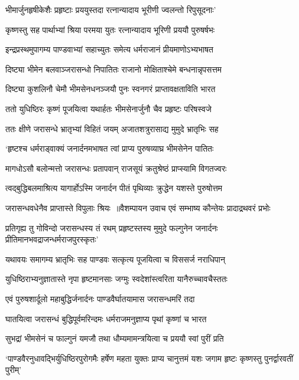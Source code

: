 \twolineshloka
{भीमार्जुनहृषीकेशैः प्रहृष्टाः प्रययुस्तदा}
{रत्नान्यादाय भूरीणी ज्वलन्तो रिपुसूदनाः'}


\twolineshloka
{कृष्णस्तु सह पार्थाभ्यां श्रिया परमया युतः}
{रत्नान्यादाय भूरिणी प्रययौ पुरुषर्षभः}


\twolineshloka
{इन्द्रप्रस्थमुपागम्य पाण्डवाभ्यां सहाच्युतः}
{समेत्य धर्मराजानं प्रीयमाणोऽभ्यभाषत}


\twolineshloka
{दिष्ट्या भीमेन बलवाञ्जरासन्धो निपातितः}
{राजानो मोक्षिताश्चेमे बन्धनान्नृपसत्तम}


\twolineshloka
{दिष्ट्या कुशलिनौ चेमौ भीमसेनधनञ्जयौ}
{पुनः स्वनगरं प्राप्तावक्षताविति भारत}


\twolineshloka
{ततो युधिष्ठिरः कृष्णं पूजयित्वा यथार्हतः}
{भीमसेनार्जुनौ चैव प्रहृष्टः परिषस्वजे}


\twolineshloka
{ततः क्षीणे जरासन्धे भ्रातृभ्यां विहितं जयम्}
{अजातशत्रुरासाद्य मुमुदे भ्रातृभिः सह}


\twolineshloka
{`हृष्टश्च धर्मराड्वाक्यं जनार्दनमभाषत}
{त्वां प्राप्य पुरुषव्याघ्र भीमसेनेन पातितः}


\twolineshloka
{मागधोऽसौ बलोन्मत्तो जरासन्धः प्रतापवान्}
{राजसूयं क्रतुश्रेष्ठं प्राप्स्यामि विगतज्वरः}


\twolineshloka
{त्वद्बुद्धिबलमाश्रित्य यागार्होऽस्मि जनार्दन}
{पीतं पृथिव्याः क्रुद्धेन यशस्ते पुरुषोत्तम}


\twolineshloka
{जरासन्धवधेनैव प्राप्तास्ते विपुलाः श्रियः ॥वैशम्पायन उवाच}
{एवं सम्भाष्य कौन्तेयः प्रादाद्रथवरं प्रभोः}


प्रतिगृह्य तु गोविन्दो जरासन्धस्य तं रथम्
\twolineshloka
{प्रहृष्टस्तस्य मुमुदे फल्गुनेन जनार्दनः}
{प्रीतिमानभवद्राजन्धर्मराजपुरस्कृतः'}


\twolineshloka
{यथावयः समागम्य भ्रातृभिः सह पाण्डवः}
{सत्कृत्य पूजयित्वा च विससर्ज नराधिपान्}


\twolineshloka
{युधिष्ठिराभ्यनुज्ञातास्ते नृपा हृष्टमानसाः}
{जग्मुः स्वदेशांस्त्वरिता यानैरुच्चावचैस्ततः}


\twolineshloka
{एवं पुरुषशार्दूलो महाबुद्धिर्जनार्दनः}
{पाण्डवैर्घातयामास जरासन्धमरिं तदा}


\twolineshloka
{घातयित्वा जरासन्धं बुद्धिपूर्वमरिन्दमः}
{धर्मराजमनुज्ञाप्य पृथां कृष्णां च भारत}


\twolineshloka
{सुभद्रां भीमसेनं च फाल्गुनं यमजौ तथा}
{धौम्यमामन्त्रयित्वा च प्रययौ स्वां पुरीं प्रति}


\threelineshloka
{`पाण्डवैरनुधावद्भिर्युधिष्ठिरपुरोगमैः}
{हर्षेण महता युक्तः प्राप्य चानुत्तमं यशः}
{जगाम हृष्टः कृष्णस्तु पुनर्द्वारवतीं पुरीम्'}


